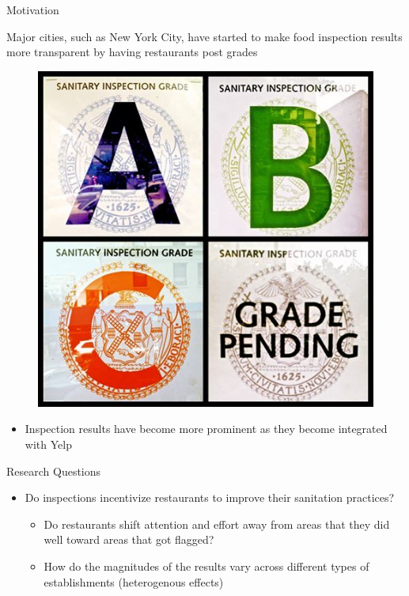 \documentclass[handout]{beamer}
\begin{document}
\begin{frame}{Motivation}
    \begin{itemize}
    \begin{minipage}{0.7\linewidth}
    \item Major cities, such as New York City, have started to make food inspection results more transparent by having restaurants post grades
    \end{minipage} 
    \begin{minipage}{0.25\linewidth}
    \begin{figure}
    \includegraphics[scale = 0.1]{grades.jpg}
    \end{figure}
    \end{minipage}
    \begin{itemize}
    \item Inspection results have become more prominent as they become integrated with Yelp
    \end{itemize}
    \end{itemize}
   
\end{frame}

\begin{frame}{Research Questions}
\pause
\begin{itemize}
\item Do inspections incentivize restaurants to improve their sanitation practices?
\begin{itemize}
\item Do restaurants shift attention and effort away from areas that they did well toward areas that got flagged?
\item How do the magnitudes of the results vary across different types of establishments (heterogenous effects)
\end{itemize}
\end{itemize}
\end{frame}
\end{document}
